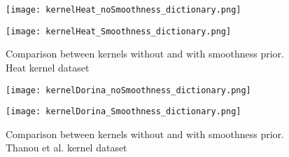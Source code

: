 \begin{figure}[htbp]
  \begin{minipage}[c]{.5\textwidth}
    \centering
    \texttt{[image: kernelHeat\_noSmoothness\_dictionary.png]}
  \end{minipage}
  \begin{minipage}[c]{.5\textwidth}
    \centering
    \texttt{[image: kernelHeat\_Smoothness\_dictionary.png]}
  \end{minipage}
  \caption{Comparison between kernels without and with smoothness prior. Heat kernel dataset}
  \label{fig:kernelHeatDictionary}
\end{figure}

\begin{figure}[htbp]
  \begin{minipage}[c]{.5\textwidth}
    \centering
    \texttt{[image: kernelDorina\_noSmoothness\_dictionary.png]}
  \end{minipage}
  \begin{minipage}[c]{.5\textwidth}
    \centering
    \texttt{[image: kernelDorina\_Smoothness\_dictionary.png]}
  \end{minipage}
  \caption{Comparison between kernels without and with smoothness prior. Thanou et al. kernel dataset}
  \label{fig:kernelDorinaDictionary}
\end{figure}

%
%
